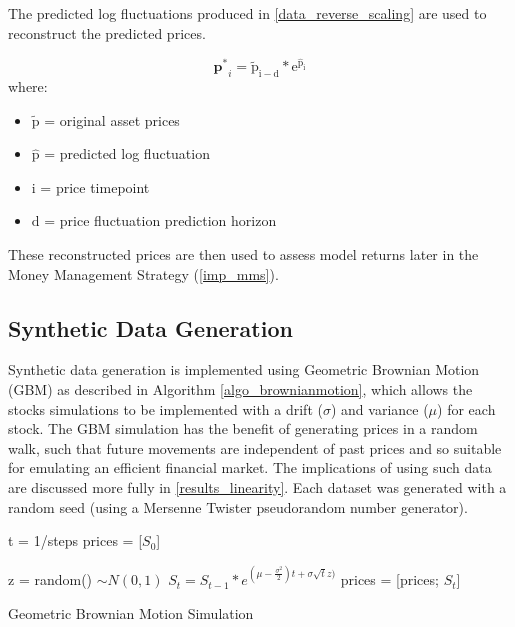 \documentclass[a4paper,11pt,oneside]{article}
\theoremstyle{plain}
\theoremstyle{definition}
\begin{document}
The predicted log fluctuations produced in \ref{data_reverse_scaling} are used to reconstruct the predicted prices. 

\begin{equation}
\mathbf{p^*}_{i} = \mathrm{\tilde{p}_{i-d} * e^{\hat{p}_{i}}}
\end{equation}
where:
\begin{itemize}
	\item [] $\mathrm{\tilde{p}}$ = original asset prices
	\item [] $\mathrm{\hat{p}}$ = predicted log fluctuation 
	\item [] $\mathrm{i}$ = price timepoint 
	\item [] $\mathrm{d}$ = price fluctuation prediction horizon

\end{itemize}
\texttt{}\newline
These reconstructed prices are then used to assess model returns later in the Money Management Strategy (\ref{imp_mms}).

\subsection{Synthetic Data Generation}\label{data_synthetic}

Synthetic data generation is implemented using Geometric Brownian Motion (GBM) as described in Algorithm \ref{algo_brownianmotion}, which allows the stocks simulations to be implemented with a drift ($\sigma$) and variance ($\mu$) for each stock. The GBM simulation has the benefit of generating prices in a random walk, such that future movements are independent of past prices and so suitable for emulating an efficient financial market. The implications of using such data are discussed more fully in \ref{results_linearity}. Each dataset was generated with a random seed (using a Mersenne Twister pseudorandom number generator). \newline

\begin{algorithm}[H]

	t = 1/steps\;
	prices = [$S_0$]\;

	{
		z = random()  $\sim N(0,1)$\;
		$S_t = S_{t-1}*e^{(\mu - \frac {\sigma^2}{2})t + \sigma  \sqrt{t}  z)}$\;
		prices = [prices; $S_t$]\;
	}
	\label{algo_brownianmotion}
	\caption{Geometric Brownian Motion Simulation}
\end{algorithm}
\end{document}
